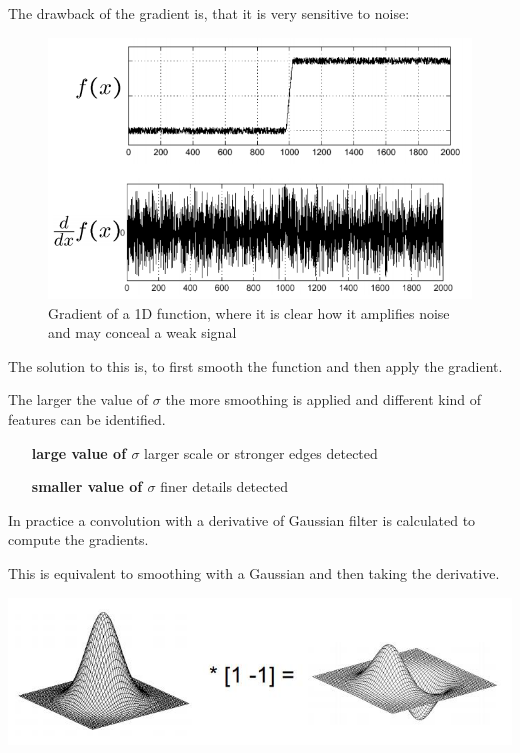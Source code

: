 \documentclass[11pt]{article}
\begin{document}
The drawback of the gradient is, that it is very sensitive to noise:
\begin{figure}[H]
	\centering
	\includegraphics[width=0.7\linewidth]{img/noise_gradient}
	\caption{Gradient of a 1D function, where it is clear how it amplifies noise and may conceal a weak signal}
	\label{fig:noisegradient}
\end{figure}

\noindent
The solution to this is, to first smooth the function and then apply the gradient.

The larger the value of $\sigma$ the more smoothing is applied and different kind of features can be identified.
\begin{itemize}[leftmargin=*, labelindent=3.5cm, labelsep=0.5cm]
	\item[\textbf{large value of $\sigma$}] larger scale or stronger edges detected
	\item[\textbf{smaller value of $\sigma$}] finer details detected
\end{itemize}

\noindent
\begin{minipage}{0.6\textwidth}
	In practice a convolution with a derivative of Gaussian filter is calculated to compute the gradients.
	
	This is equivalent to smoothing with a Gaussian and then taking the derivative.
\end{minipage}
\begin{minipage}{0.4\textwidth}
	\begin{center}
		\includegraphics[width=0.6\linewidth]{img/derivative_gaussian_filter}
	\end{center}
\end{minipage}
\end{document}
